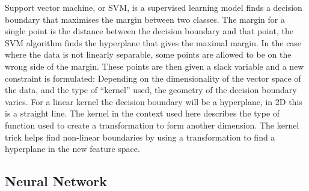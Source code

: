 \documentclass[a4paper,11pt,twoside]{article}
\begin{document}
Support vector machine, or SVM, is a supervised learning model finds a decision boundary that maximises the margin between two classes. The margin for a single point is the distance between the decision boundary and that point, the SVM algorithm finds the hyperplane that gives the maximal margin.
\newline
In the case where the data is not linearly separable, some points are allowed to be on the wrong side of the margin. These points are then given a slack variable and a new constraint is formulated:
\newline
Depending on the dimensionality of the vector space of the data, and the type of “kernel” used, the geometry of the decision boundary varies. For a linear kernel the decision boundary will be a hyperplane, in 2D this is a straight line. The kernel in the context used here describes the type of function used to create a transformation to form another dimension. The kernel trick helps find non-linear boundaries by using a transformation to find a hyperplane in the new feature space. 

\subsection{Neural Network}
\end{document}
